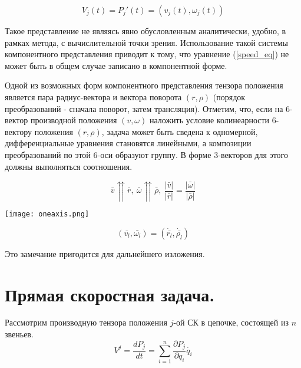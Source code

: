 \documentclass[12pt,a4paper,titlepage]{article}
\begin{document}
\begin{equation}\label{speed_eq_comp} 
V_j(t) = P_j'(t) = (v_j(t),\omega_j(t)) 
\end{equation}

Такое представление не являясь явно обусловленным аналитически, удобно, в рамках метода, с вычислительной точки зрения. Использование такой системы компонентного представления приводит к тому, что уравнение (\ref{speed_eq}) не может быть в общем случае записано в компонентной форме.

Одной из возможных форм компонентного представления тензора положения является пара радиус-вектора и вектора поворота $(r,\rho)$ (порядок преобразований - сначала поворот, затем трансляция). Отметим, что, если на 6-вектор производной положения $(v,\omega)$ наложить условие колинеарности 6-вектору положения $(r,\rho)$, задача может быть сведена к одномерной, дифференциальные уравнения становятся линейными, а композиции преобразований по этой 6-оси образуют группу. В форме 3-векторов для этого должны выполняться соотношения.

\begin{equation}\label{} 
\bar{v} \upuparrows \bar{r}, \  \bar{\omega} \upuparrows \bar{\rho}, \  \frac{|\bar{v}|}{|\bar{r}|} = \frac{|\bar{\omega}|}{|\bar{\rho}|} 
\end{equation}

\begin{center}
  \texttt{[image: oneaxis.png]}
  \label{}
\end{center}

\begin{equation}
(\bar{v_l},\bar{\omega_l}) = (\dot{\bar{r_l}},\dot{\bar{\rho_l}})
\end{equation}

Это замечание пригодится для дальнейшего изложения.

\newpage
\section{Прямая скоростная задача.}

Рассмотрим производную тензора положения $j$-ой СК в цепочке, состоящей из $n$ звеньев.
\begin{equation}\label{eq1}
V^j = \frac{dP_j}{dt} = \sum_{i=1}^{n}\frac{\partial{P_j}}{\partial{q_i}}\dot{q_i} 
\end{equation}
\end{document}
